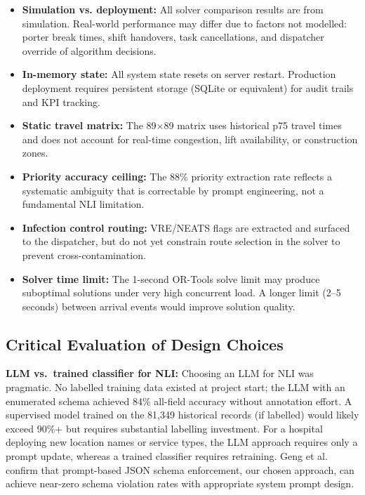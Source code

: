 \documentclass[12pt,a4paper]{article}
\begin{document}
\begin{itemize}
  \item \textbf{Simulation vs. deployment:} All solver comparison results are from simulation. Real-world performance may differ due to factors not modelled: porter break times, shift handovers, task cancellations, and dispatcher override of algorithm decisions.
  \item \textbf{In-memory state:} All system state resets on server restart. Production deployment requires persistent storage (SQLite or equivalent) for audit trails and KPI tracking.
  \item \textbf{Static travel matrix:} The 89$\times$89 matrix uses historical p75 travel times and does not account for real-time congestion, lift availability, or construction zones.
  \item \textbf{Priority accuracy ceiling:} The 88\% priority extraction rate reflects a systematic ambiguity that is correctable by prompt engineering, not a fundamental NLI limitation.
  \item \textbf{Infection control routing:} VRE/NEATS flags are extracted and surfaced to the dispatcher, but do not yet constrain route selection in the solver to prevent cross-contamination.
  \item \textbf{Solver time limit:} The 1-second OR-Tools solve limit may produce suboptimal solutions under very high concurrent load. A longer limit (2--5 seconds) between arrival events would improve solution quality.
\end{itemize}

\subsection{Critical Evaluation of Design Choices}

\textbf{LLM vs.\ trained classifier for NLI:} Choosing an LLM for NLI was pragmatic. No labelled training data existed at project start; the LLM with an enumerated schema achieved 84\% all-field accuracy without annotation effort. A supervised model trained on the 81,349 historical records (if labelled) would likely exceed 90\%+ but requires substantial labelling investment. For a hospital deploying new location names or service types, the LLM approach requires only a prompt update, whereas a trained classifier requires retraining. Geng et al.\ \cite{geng2025} confirm that prompt-based JSON schema enforcement, our chosen approach, can achieve near-zero schema violation rates with appropriate system prompt design.
\end{document}

